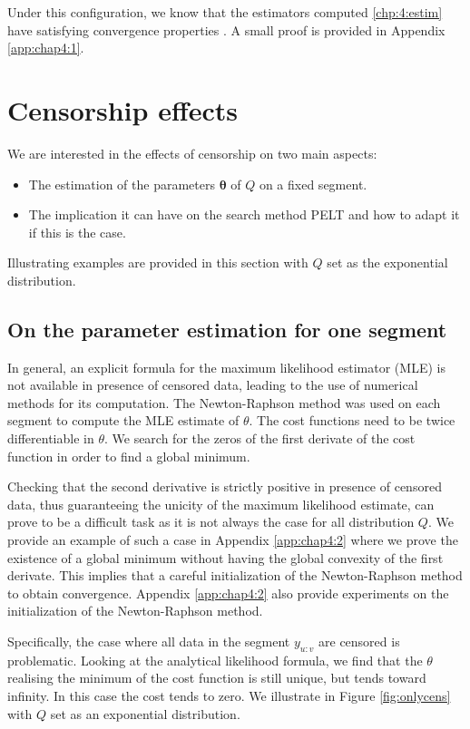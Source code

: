 Under this configuration, we know that the estimators computed \ref{chp:4:estim} have satisfying convergence properties \citep{Lavielle1997}. A small proof is provided in Appendix \ref{app:chap4:1}.

\section{Censorship effects}\label{chp:4:2}

We are interested in the effects of censorship on two main aspects: 
\begin{itemize}
\item The estimation of the parameters $\bm \theta$ of $Q$ on a fixed segment. 
\item The implication it can have on the search method PELT and how to adapt it if this is the case. 
\end{itemize} 
Illustrating examples are provided in this section with $Q$ set as the exponential distribution.

\subsection{On the parameter estimation for one segment}

In general, an explicit formula for the maximum likelihood estimator (MLE) is not available in presence of censored data, leading to the use of numerical methods for its computation. The Newton-Raphson method was used on each segment to compute the MLE estimate of $\theta$. The cost functions need to be twice differentiable in $\theta$. We search for the zeros of the first derivate of the cost function in order to find a global minimum. 

Checking that the second derivative is strictly positive in presence of censored data, thus guaranteeing the unicity of the maximum likelihood estimate, can prove to be a difficult task as it is not always the case for all distribution $Q$. We provide an example of such a case in Appendix \ref{app:chap4:2} where we prove the existence of a global minimum without having the global convexity of the first derivate. This implies that a careful initialization of the Newton-Raphson method to obtain convergence. Appendix \ref{app:chap4:2} also provide experiments on the initialization of the Newton-Raphson method. 

Specifically, the case where all data in the segment $y_{u:v}$ are censored is problematic. Looking at the analytical likelihood formula, we find that the $\theta$ realising the minimum of the cost function is still unique, but tends toward infinity. In this case the cost tends to zero. We illustrate in Figure \ref{fig:onlycens} with $Q$ set as an exponential distribution. 

